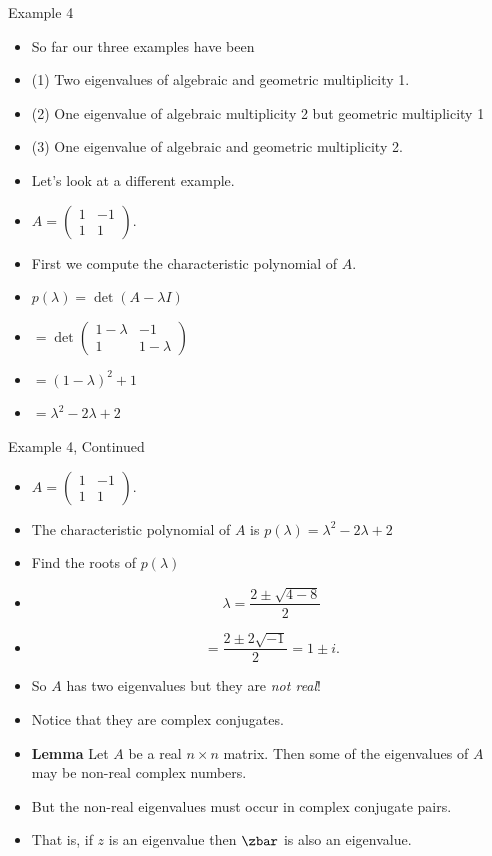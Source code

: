 \documentclass{beamer}
\begin{document}
\begin{frame}{Example 4}

\begin{itemize}
\item So far our three examples have been
\item (1) Two eigenvalues of algebraic and geometric multiplicity 1.
\item (2) One eigenvalue of algebraic multiplicity 2 but geometric multiplicity 1
\item (3) One eigenvalue of algebraic and geometric multiplicity 2.
\item Let's look at a different example.
\item
$A=
\begin{pmatrix}
1 & -1 \\
1 & 1
\end{pmatrix}
$.
\item First we compute the characteristic polynomial of $A$.
\item $p(\lambda) = \det(A-\lambda I)$
\item $=\det
\begin{pmatrix}
1 -\lambda & -1 \\
1 & 1 - \lambda
\end{pmatrix}
$
\item $=(1-\lambda)^2 + 1$
\item $=\lambda^2-2\lambda + 2$
\end{itemize}
\end{frame}

\begin{frame}{Example 4, Continued}

\begin{itemize}
\item $A=
\begin{pmatrix}
1 & -1 \\
1 & 1
\end{pmatrix}
$.
\item The characteristic polynomial of $A$ is
$p(\lambda) = \lambda^2-2\lambda + 2$
\item Find the roots of $p(\lambda)$
\item
$$
\lambda = \frac{2 \pm \sqrt{4 - 8}}{2}
$$
\item
$$
 = \frac{2 \pm 2\sqrt{-1}}{2} = 1 \pm i.
$$
\item So $A$ has two eigenvalues but they are \emph{not real}!
\item Notice that they are complex conjugates.
\item \textbf{Lemma} Let $A$ be a real $n\times n$ matrix. Then some of the
eigenvalues of $A$ may be non-real complex numbers.
\item But the non-real eigenvalues must occur in complex conjugate pairs.
\item That is, if $z$ is an eigenvalue then $\zbar$ is also an eigenvalue.
\end{itemize}
\end{frame}
\end{document}

